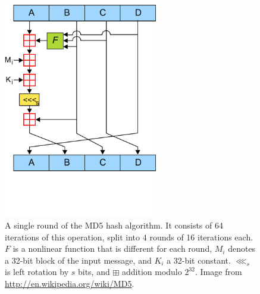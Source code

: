 \begin{figure}
    \centering
    \includegraphics[width=0.6\textwidth]{images/results/MD5/MD5}
    \caption[A single round of the MD5 hash algorithm]{A single round of the MD5
        hash algorithm. It consists of 64 iterations of this operation, split
        into 4 rounds of 16 iterations each. $F$ is a nonlinear function that is
        different for each round, $M_i$ denotes a 32-bit block of the input
        message, and $K_i$ a 32-bit constant. $\lll_s$ is left rotation by $s$
        bits, and $\boxplus$ addition modulo $2^{32}$. Image from
        \url{http://en.wikipedia.org/wiki/MD5}.}
    \label{fig:md5_round}
\end{figure}


